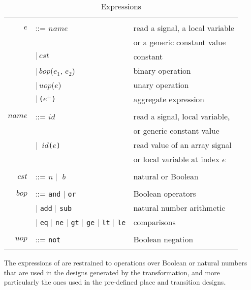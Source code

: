 \begin{table}[!htbp]
  \caption{Expressions}
  \label{tab:expr}
  \begin{tabular}{|rll|}
    \hline
    & & \\
    $e$ & ::= $name$ & read a signal, a local variable \\
    & & or a generic constant value \\
    & \quad $\vert{}~cst$ & constant \\
    & \quad $\vert{}~bop$($e_1$, $e_2$) & binary operation \\
    & \quad $\vert{}~uop$($e$) & unary operation \\
    & \quad $\vert{}~$\texttt{(}$e^{+}$\texttt{)} & aggregate expression \\
    & & \\
    $name$ & ::= $id$ & read a signal, local variable, \\
    & & or generic constant value \\
    & \quad$\vert{}~$ $id$\texttt{(}$e$\texttt{)} & read value of an array signal  \\
    & & or local variable at index $e$ \\
    & & \\
    $cst$ & ::= $n$ $\vert{}~$ $b$ & natural or Boolean \\
    & & \\
    $bop$ & ::= \texttt{and} $\vert{}$ \texttt{or} & Boolean operators \\
    & \quad$\vert{}$ \texttt{add} $\vert{}$ \texttt{sub} & natural number arithmetic \\
    & \quad$\vert{}$ \texttt{eq} $\vert{}$ \texttt{ne} $\vert{}$ \texttt{gt} $\vert{}$ \texttt{ge} $\vert{}$ \texttt{lt} $\vert{}$ \texttt{le} & comparisons \\
    & & \\
    $uop$ & ::= \texttt{not} & Boolean negation \\
    & & \\
    \hline
  \end{tabular}
\end{table}

The expressions of \hvhdl{} are restrained to operations over Boolean
or natural numbers that are used in the designs generated by the
transformation, and more particularly the ones used in the pre-defined
place and transition designs.

